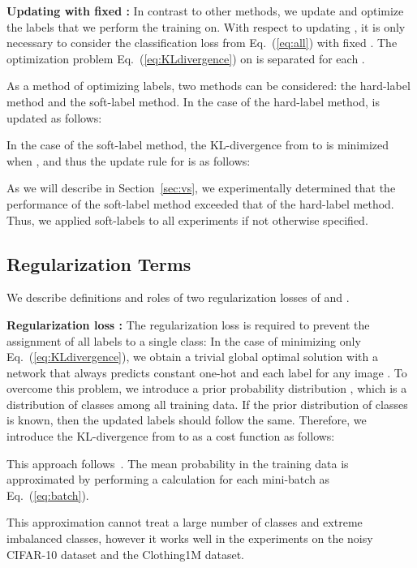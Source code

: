 \documentclass[10pt,twocolumn,letterpaper]{article}
\newcommand{\Eref}[1]{Eq.~(\ref{#1})}
\newcommand{\Sref}[1]{Section~\ref{#1}}
\begin{document}
\vspace{2mm}\noindent\textbf{Updating  with fixed :}
In contrast to other methods, we update and optimize the labels that we perform the training on.
With respect to updating , it is only necessary to consider the classification loss  from \Eref{eq:all} with fixed . The optimization problem \Eref{eq:KLdivergence} on  is separated for each .

As a method of optimizing labels, two methods can be considered: the hard-label method and the soft-label method.
In the case of the hard-label method,  is updated as follows:

In the case of the soft-label method, the KL-divergence from  to  is minimized when , and thus the update rule for  is as follows:

As we will describe in \Sref{sec:vs}, we experimentally determined that the performance of the soft-label method exceeded that of the hard-label method. Thus, we applied soft-labels to all experiments if not otherwise specified.

\addtolength\textfloatsep{5mm}
\subsection{Regularization Terms}\label{sec:regterm}
We describe definitions and roles of two regularization losses of  and .

\vspace{2mm}\noindent\textbf{Regularization loss :}
The regularization loss  is required to prevent the assignment of all labels to a single class: In the case of minimizing only \Eref{eq:KLdivergence}, we obtain a trivial global optimal solution with a network that always predicts constant one-hot  and each label  for any image .
To overcome this problem, we introduce a prior probability distribution , which is a distribution of classes among all training data. If the prior distribution of classes is known, then the updated labels should follow the same. Therefore, we introduce the KL-divergence from  to  as a cost function as follows:

This approach follows~\cite{hu2017learning}. The mean probability  in the training data is approximated by performing a calculation for each mini-batch  as \Eref{eq:batch}.

This approximation cannot treat a large number of classes and extreme imbalanced classes, however it works well in the experiments on the noisy CIFAR-10 dataset and the Clothing1M dataset.
\end{document}
